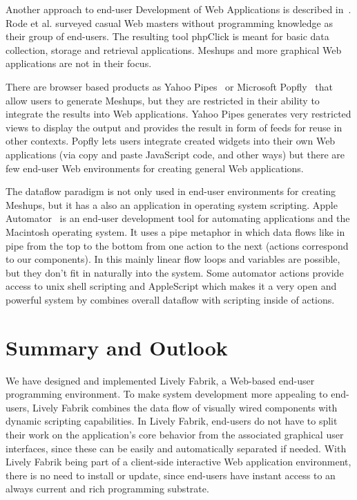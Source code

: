 \documentclass[pdftex, times, 10pt, twocolumn]{article}
\begin{document}
Another approach to end-user Development of Web Applications is described in~\cite{Rode2006EUD}. Rode et al. surveyed casual Web masters without programming knowledge as their group of end-users. The resulting tool phpClick is meant for basic data collection, storage and retrieval applications. Meshups and more graphical Web applications are not in their focus. 

There are browser based products as Yahoo Pipes~\cite{YahooPipes} or Microsoft Popfly~\cite{MicrosoftPopfly} that allow users to generate Meshups, but they are restricted in their ability to integrate the results into Web applications. Yahoo Pipes generates very restricted views to display the output and provides the result in form of feeds for reuse in other contexts. Popfly lets users integrate created widgets into their own Web applications (via copy and paste JavaScript code, and other ways) but there are few end-user Web environments for creating general Web applications. 

The dataflow paradigm is not only used in end-user environments for creating Meshups, but it has a also an application in operating system scripting. Apple Automator~\cite{AppleAutomator} is an end-user development tool for automating applications and the Macintosh operating system. It uses a pipe metaphor in which data flows like in pipe from the top to the bottom from one action to the next (actions correspond to our components). In this mainly linear flow loops and variables are possible, but they don't fit in naturally into the system. Some automator actions provide access to unix shell scripting and AppleScript which makes it a very open and powerful system by combines overall dataflow with scripting inside of actions. 



\section{Summary and Outlook}
We have designed and implemented Lively Fabrik, a Web-based end-user programming environment. To make system development more appealing to end-users, Lively Fabrik combines the data flow of visually wired components with dynamic scripting capabilities. In Lively Fabrik, end-users do not have to split their work on the application's core behavior from the associated graphical user interfaces, since these can be easily and automatically separated if needed. With Lively Fabrik being part of a client-side interactive Web application environment, there is no need to install or update, since end-users have instant access to an always current and rich programming substrate. 
\end{document}
